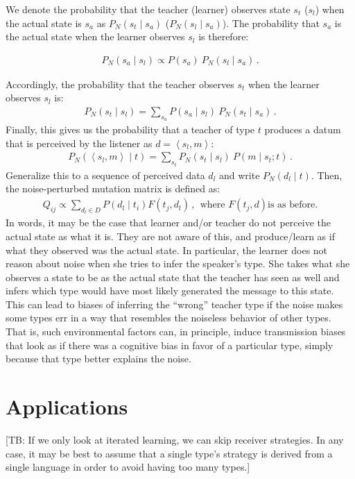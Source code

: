 \documentclass[11pt]{article}
\newcommand{\tuple}[1]{\ensuremath{\left\langle #1 \right\rangle}}
\newcommand{\tb}[1]{\textcolor[rgb]{.8,.33,.0}{[TB: #1]}}%
\begin{document}
We denote the probability that the teacher (learner) observes state $s_t$ ($s_l$) when the actual state is $s_a$ as $P_N(s_t \mid s_a)$ ($P_N(s_l \mid s_a)$). The probability that $s_a$ is the actual state when the learner observes $s_l$ is therefore:

\begin{align*}
  P_N(s_a \mid s_l) \propto P(s_a) \ P_N(s_l \mid s_a)\,.
\end{align*}

Accordingly, the probability that the teacher observes $s_t$ when the learner observes $s_l$ is:
\begin{align*}
  P_N(s_t \mid s_l) = \sum_{s_a} P(s_a \mid s_l) \ P_N(s_t \mid s_a)\,.
\end{align*}
Finally, this gives us the probability that a teacher of type $t$ produces a datum that is
perceived by the listener as $d = \tuple{s_l, m}$:
\begin{align*}
  P_N(\tuple{s_l, m} \mid t) = \sum_{s_t} P_N(s_t \mid s_l) \ P(m \mid s_t; t)\,.
\end{align*}
Generalize this to a sequence of perceived data $d_l$ and write $P_N(d_l \mid t)$. Then, the noise-perturbed mutation matrix is defined as:
\begin{align*}
  Q_{ij}  \propto \sum_{d_l \in D} P(d_l \mid t_i) F(t_j,d_l) \,, \ \  \text{where $F(t_j,d)$
    is as before.}
\end{align*}
In words, it may be the case that learner and/or teacher do not perceive the actual state as what it is. They are not aware of this, and produce/learn as if what they observed was the actual state. In particular, the learner does not reason about noise when she tries to infer the speaker's type. She takes what she observes a state to be as the actual state that the teacher has seen as well and infers which type would have most likely generated the message to this state. This can lead to biases of inferring the ``wrong'' teacher type if the noise makes some types err in a way that resembles the noiseless behavior of other types. That is, such environmental factors can, in principle, induce transmission biases that look as if there was a cognitive bias in favor of a particular type, simply because that type better explains the noise.

\section{Applications}
\tb{If we only look at iterated learning, we can skip receiver strategies. In any case, it may be best to assume that a single type's strategy is derived from a single language in order to avoid having too many types.}
\end{document}
